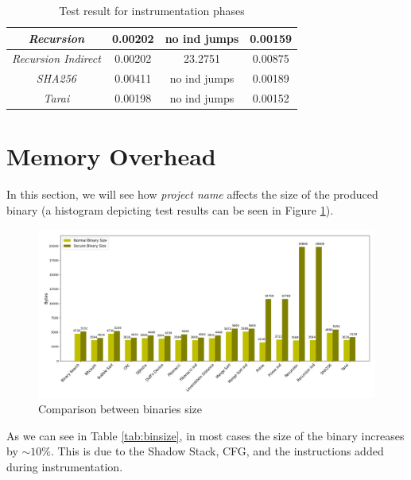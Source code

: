 \begin{table}
\begin{tabular}{|c|c|c|c|}
    \hline
    \textit{Recursion}                   & 0.00202                      & no ind jumps            & 0.00159                     \\
    \hline
    \textit{Recursion Indirect}          & 0.00202                      & 23.2751                 & 0.00875                     \\
    \hline
    \textit{SHA256}                      & 0.00411                      & no ind jumps            & 0.00189                     \\
    \hline
    \textit{Tarai}                       & 0.00198                      & no ind jumps            & 0.00152                     \\
    \hline
  \end{tabular}
  \caption{Test result for instrumentation phases}
  \label{tab:othertimes}
\end{table}

\section{Memory Overhead}
\label{sec:pa_memory}

In this section, we will see how \textit{project name} affects the size of the
produced binary (a histogram depicting test results can be seen in Figure \ref{fig:binsize}).

\begin{figure}[htbp]
  \centering
  \includegraphics[width=.9\linewidth]{images/size.png}
  \caption{Comparison between binaries size}
  \label{fig:binsize}
\end{figure}

As we can see in Table \ref{tab:binsize}, in most cases the size of the binary
increases by $\sim 10\%$. This is due to the Shadow Stack, CFG, and the instructions
added during instrumentation.

